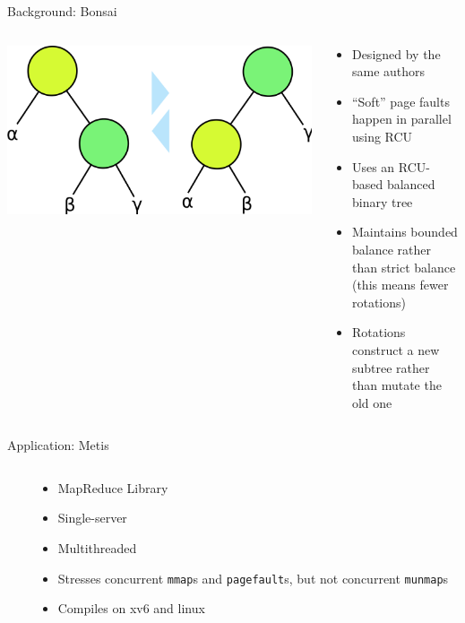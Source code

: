 \documentclass[aspectratio=169]{beamer}
\newcommand{\bi}{\begin{itemize}}
\newcommand{\ei}{\end{itemize}}
\begin{document}
\begin{frame}{Background: Bonsai}
  \begin{columns}[T]
    \begin{column}{0.6\textwidth}
      \begin{center}
        \includegraphics[scale=0.2]{./figures/Binary_tree_rotation.png}
      \end{center}
    \end{column}
    \begin{column}{0.4\textwidth}
      \bi
    \item Designed by the same authors
    \item ``Soft'' page faults happen in parallel using RCU
    \item Uses an RCU-based balanced binary tree
    \item Maintains bounded balance rather than strict balance\\
      (this means fewer rotations)
    \item Rotations construct a new subtree rather than mutate the old one
      \ei
    \end{column}
  \end{columns}
\end{frame}

\begin{frame}{Application: Metis}
  \begin{columns}[T]
    \begin{column}{0.5\textwidth}
      
    \end{column}
    \begin{column}{0.5\textwidth}
      \bi
    \item MapReduce Library
    \item Single-server
    \item Multithreaded
    \item Stresses concurrent \texttt{mmap}s and \texttt{pagefault}s, but not concurrent \texttt{munmap}s
    \item Compiles on xv6 and linux
      \ei
    \end{column}
  \end{columns}
\end{frame}
\end{document}

